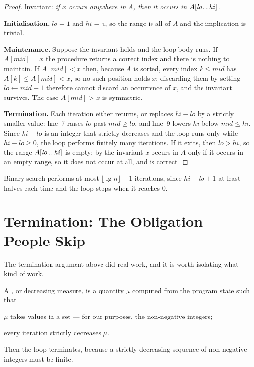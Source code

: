 \begin{proof}
Invariant: \emph{if $x$ occurs anywhere in $A$, then it occurs in
$A[\mathit{lo} \mathinner{\ldotp\ldotp} \mathit{hi}]$.}

\smallskip
\textbf{Initialisation.} $\mathit{lo} = 1$ and $\mathit{hi} = n$, so the range
is all of $A$ and the implication is trivial.

\smallskip
\textbf{Maintenance.} Suppose the invariant holds and the loop body runs. If
$A[\mathit{mid}] = x$ the procedure returns a correct index and there is nothing
to maintain. If $A[\mathit{mid}] < x$ then, because $A$ is sorted, every index
$k \le \mathit{mid}$ has $A[k] \le A[\mathit{mid}] < x$, so no such position
holds $x$; discarding them by setting $\mathit{lo} \gets \mathit{mid}+1$
therefore cannot discard an occurrence of $x$, and the invariant survives. The
case $A[\mathit{mid}] > x$ is symmetric.

\smallskip
\textbf{Termination.} Each iteration either returns, or replaces
$\mathit{hi}-\mathit{lo}$ by a strictly smaller value: line~7 raises
$\mathit{lo}$ past $\mathit{mid} \ge \mathit{lo}$, and line~9 lowers
$\mathit{hi}$ below $\mathit{mid} \le \mathit{hi}$. Since
$\mathit{hi}-\mathit{lo}$ is an integer that strictly decreases and the loop
runs only while $\mathit{hi} - \mathit{lo} \ge 0$, the loop performs finitely
many iterations. If it exits, then $\mathit{lo} > \mathit{hi}$, so the range
$A[\mathit{lo} \mathinner{\ldotp\ldotp} \mathit{hi}]$ is empty; by the invariant
$x$ occurs in $A$ only if it occurs in an empty range, so it does not occur at
all, and  is correct.
\end{proof}

\begin{corollary}
Binary search performs at most $\lfloor \lg n \rfloor + 1$ iterations, since
$\mathit{hi}-\mathit{lo}+1$ at least halves each time and the loop stops when
it reaches $0$.
\end{corollary}

\section{Termination: The Obligation People Skip}

The termination argument above did real work, and it is worth isolating what
kind of work.

\begin{definitionbox}
A , or decreasing measure, is a quantity $\mu$ computed from
the program state such that

\begin{tight}
  \item $\mu$ takes values in a  set --- for our purposes,
        the non-negative integers;
  \item every iteration strictly decreases $\mu$.
\end{tight}

\smallskip
Then the loop terminates, because a strictly decreasing sequence of
non-negative integers must be finite.
\end{definitionbox}

